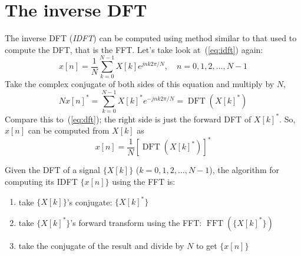 
\section{The inverse DFT}

The inverse DFT (\emph{IDFT}) can be computed using method similar to
that used to compute the DFT, that is the FFT. Let's take look
at~(\ref{eq:idft}) again:
\begin{equation*}
x[n]=\frac{1}{N} \sum_{k=0}^{N-1} X[k] e^{j n k 2\pi/N}, \quad
n=0,1,2,\ldots, N-1
\end{equation*}
Take the complex conjugate of both sides of this equation and multiply
by $N$, 
\begin{equation}
Nx[n]^*=\sum_{k=0}^{N-1} X[k]^* e^{-j n k 2\pi/N} = \operatorname{DFT}(X[k]^*)
\end{equation}
Compare this to~(\ref{eq:dft}); the right side is just the forward
DFT of $X[k]^*$. So, $x[n]$ can be computed from $X[k]$ as 
\begin{equation}
x[n]=\frac{1}{N} [\operatorname{DFT}(X[k]^*)]^*
\end{equation}

Given the DFT of a signal $\{X[k]\}$ ($k=0,1,2,\ldots, N-1$), the
algorithm for computing its IDFT $\{x[n]\}$ using the FFT is:
\begin{enumerate}
\item take $\{X[k]\}$'s conjugate:  $\{X[k]^*\}$
\item take $\{X[k]^*\}$'s forward transform using the FFT:
$\operatorname{FFT}(\{X[k]^*\})$
\item take the conjugate of the result and divide by $N$ to get $\{x[n]\}$
\end{enumerate}

